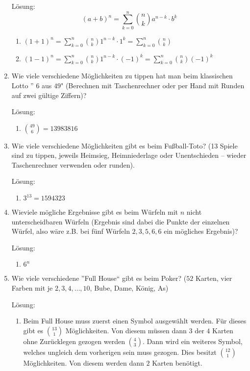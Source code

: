 \documentclass[main.tex]{subfiles}
\begin{document}
\begin{enumerate}
	      Lösung:
	      \[ (a + b)^n = \sum_{k=0}^{n} \binom{n}{k} a^{n-k} \cdot b^k \]
	      \begin{enumerate}
		      \item \( (1+1)^n = \sum_{k = 0}^{n} \binom{n}{k} 1^{n-k} \cdot 1^k
		            = \sum_{k = 0}^{n} \binom{n}{k} \)
		      \item \( (1-1)^n = \sum_{k = 0}^{n} \binom{n}{k} 1^{n-k} \cdot (-1)^k
		            = \sum_{k = 0}^{n} \binom{n}{k} (-1)^k \)

	      \end{enumerate}
	\item Wie viele verschiedene Möglichkeiten zu tippen hat man beim klassischen
	      Lotto ” \( 6 \) aus \( 49 \)" (Berechnen mit Taschenrechner oder per Hand mit Runden
	      auf zwei gültige Ziffern)?

	      Lösung:
	      \begin{enumerate}
		      \item \( \binom{49}{6} = 13983816 \)
	      \end{enumerate}
	\item Wie viele verschiedene Möglichkeiten gibt es beim Fußball-Toto?
	      (13 Spiele sind zu tippen, jeweils Heimsieg, Heimniederlage oder Unentschieden –
	      wieder Taschenrechner verwenden oder runden).

	      Lösung:
	      \begin{enumerate}
		      \item \( 3^{13} = 1594323 \)
	      \end{enumerate}
	\item Wieviele mögliche Ergebnisse gibt es beim Würfeln mit \( n \) nicht unterscheidbaren
	      Würfeln (Ergebnis sind dabei die Punkte der einzelnen Würfel,
	      also wäre z.B. bei fünf Würfeln \( 2,3,5,6,6 \) ein mögliches Ergebnis)?

	      Lösung:
	      \begin{enumerate}
		      \item \( 6^n \)
	      \end{enumerate}
	\item Wie viele verschiedene ”Full House“ gibt es beim Poker?
	      (\( 52 \) Karten, vier Farben mit je \( 2,3,4, \dots, 10 \), Bube, Dame, König, As)

	      Lösung:
	      \begin{enumerate}
		      \item Beim Full House muss zuerst einen Symbol ausgewählt werden.
		            Für dieses gibt es \( \binom{13}{1} \) Möglichkeiten. Von diesem müssen dann
		            \( 3 \) der \( 4 \) Karten ohne Zurücklegen gezogen werden \( \binom{4}{3} \).
		            Dann wird ein weiteres Symbol, welches ungleich dem vorherigen sein muss gezogen.
		            Dies besitzt \( \binom{12}{1} \) Möglichkeiten. Von diesem werden dann \( 2 \) Karten benötigt.


\end{enumerate}
\end{enumerate}
\end{document}
